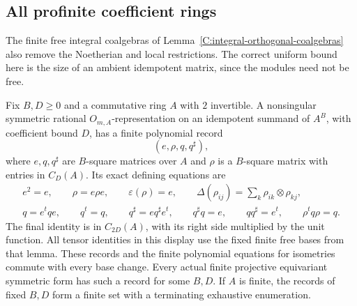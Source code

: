 \subsection{All profinite coefficient rings}
\label{C:profinite-subsection}

The finite free integral coalgebras of
Lemma~\ref{C:integral-orthogonal-coalgebras} also remove
the Noetherian and local restrictions. The correct
uniform bound here is the size of an ambient idempotent
matrix, since the modules need not be free.

\begin{lemma}
\label{C:profinite-projective-data}
Fix $B,D\geq0$ and a commutative ring $A$ with $2$ invertible.
A nonsingular symmetric rational $O_{m,A}$-representation
on an idempotent summand of $A^B$, with coefficient bound
$D$, has a finite polynomial record
\[
               (e,\rho,q,q^\sharp),                     \tag{C.3.PF1}
\]
where $e,q,q^\sharp$ are $B$-square matrices over $A$
and $\rho$ is a $B$-square matrix with entries in $C_D(A)$.
Its exact defining equations are
\[
\begin{gathered}
 e^2=e,\qquad \rho=e\rho e,\qquad
 \varepsilon(\rho)=e,\qquad
 \Delta(\rho_{ij})=\sum_k\rho_{ik}\otimes\rho_{kj},\\
 q=e^tqe,\qquad q^t=q,\qquad
 q^\sharp=e q^\sharp e^t,\qquad
 q^\sharp q=e,\qquad qq^\sharp=e^t,\qquad
                         \rho^t q\rho=q .
\end{gathered}                                           \tag{C.3.PF2}
\]
The final identity is in $C_{2D}(A)$, with its right
side multiplied by the unit function. All tensor
identities in this display use the fixed finite free
bases from that lemma.
These records and the finite polynomial equations for
isometries commute with every base change.
Every actual finite projective equivariant symmetric
form has such a record for some $B,D$.
If $A$ is finite, the records of fixed $B,D$ form a
finite set with a terminating exhaustive enumeration.
\end{lemma}
